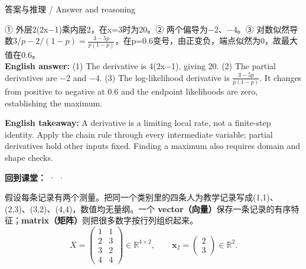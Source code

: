 \begin{StudySolution}{答案与推理 / Answer and reasoning}


① 外层2(2x\ensuremath{-}1)乘内层2，在x=3时为20。② 两个偏导为\ensuremath{-}2、\ensuremath{-}4。③ 对数似然导数\(3/p-2/(1-p)=\)\(\frac{3-5p}{p(1-p)}\)，在p=0.6变号，由正变负，端点似然为0，故最大值在0.6。\\

\textbf{English answer:} (1) The derivative is 4(2x\ensuremath{-}1), giving 20. (2) The partial derivatives are \ensuremath{-}2 and \ensuremath{-}4. (3) The log-likelihood derivative is \(\frac{3-5p}{p(1-p)}\). It changes from positive to negative at 0.6 and the endpoint likelihoods are zero, establishing the maximum.


\end{StudySolution}


\textbf{English takeaway:} A derivative is a limiting local rate, not a finite-step identity. Apply the chain rule through every intermediate variable; partial derivatives hold other inputs fixed. Finding a maximum also requires domain and shape checks.


\textbf{回到课堂：}  ·  · 











假设每条记录有两个测量。把同一个类别里的四条人为教学记录写成(1,1)、(2,3)、(3,2)、(4,4)，数值均无量纲。一个 \textbf{vector（向量）}保存一条记录的有序特征；\textbf{matrix（矩阵）}则把很多数字按行列组织起来。
\[
X=\begin{pmatrix}1&1\\2&3\\3&2\\4&4\end{pmatrix}\in\mathbb R^{4\times2},
\qquad \mathbf{x}_2=\begin{pmatrix}2\\3\end{pmatrix}\in\mathbb R^2.\tag{M.23}
\]


